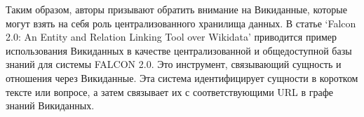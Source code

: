 Таким образом, авторы призывают обратить внимание на Викиданные, которые могут взять на себя роль централизованного хранилища данных. В статье ‘Falcon 2.0: An Entity
and Relation Linking Tool over Wikidata’ \cite{Falcon_2.0} приводится пример использования Викиданных в качестве централизованной и общедоступной базы знаний для системы FALCON 2.0. Это инструмент, связывающий сущность и отношения через Викиданные. Эта система идентифицирует сущности в коротком тексте или вопросе, а затем связывает их с соответствующими URL в графе знаний Викиданных.
